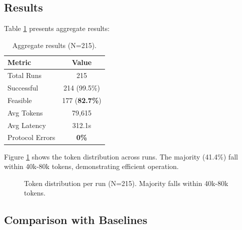 \documentclass[conference]{IEEEtran}
\begin{document}
\subsection{Results}

Table \ref{tab:results} presents aggregate results:

\begin{table}[h]
\centering
\begin{tabular}{lc}
\toprule
\textbf{Metric} & \textbf{Value} \\
\midrule
Total Runs & 215 \\
Successful & 214 (99.5\%) \\
Feasible & 177 (\textbf{82.7\%}) \\
Avg Tokens & 79,615 \\
Avg Latency & 312.1s \\
Protocol Errors & \textbf{0\%} \\
\bottomrule
\end{tabular}
\caption{Aggregate results (N=215).}
\label{tab:results}
\end{table}

Figure \ref{fig:token_dist} shows the token distribution across runs. The majority (41.4\%) fall within 40k-80k tokens, demonstrating efficient operation.

\begin{figure}[htbp]
    \centering
    \caption{Token distribution per run (N=215). Majority falls within 40k-80k tokens.}
    \label{fig:token_dist}
\end{figure}

\subsection{Comparison with Baselines}
\end{document}
